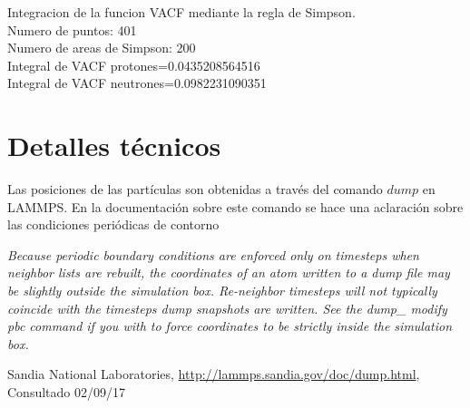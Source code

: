 \documentclass[
 reprint,
 amsmath,amssymb,
 aps,
 a4paper
]{revtex4-1}
\begin{document}
Integracion de la funcion VACF mediante la regla de Simpson.\\
Numero de puntos: 401\\
Numero de areas de Simpson: 200\\
Integral de VACF protones=0.0435208564516\\
Integral de VACF neutrones=0.0982231090351\\



\section{\label{seq:details}Detalles técnicos}
Las posiciones de las partículas son obtenidas a través del comando $dump$ en LAMMPS. En la documentación\cite{dumplammps} sobre este comando se hace una aclaración sobre las condiciones periódicas de contorno
\begin{framed}
\textit{Because periodic boundary conditions are enforced only on timesteps when neighbor lists are rebuilt, the coordinates of an atom written to a dump file may be slightly outside the simulation box. Re-neighbor timesteps will not typically coincide with the timesteps dump snapshots are written. See the dump\_ modify pbc command if you with to force coordinates to be strictly inside the simulation box.}
\end{framed}


\begin{thebibliography}{9}

  Sandia National Laboratories,
  \url{http://lammps.sandia.gov/doc/dump.html},
  Consultado 02/09/17

\end{thebibliography}
\end{document}
